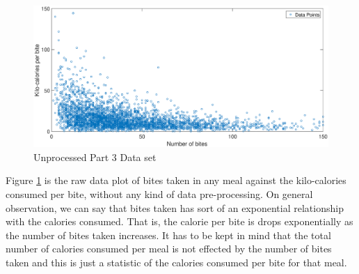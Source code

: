 \documentclass[12pt]{article}
\begin{document}
\begin{figure}[b!]
\centering
	\includegraphics[width=\textwidth]{dataC}
	\caption{Unprocessed Part 3 Data set }
	\label{fig:unproc}
\end{figure}
\noindent
Figure \ref{fig:unproc} is the raw data plot of bites taken in any meal against the kilo-calories consumed per bite, without any kind of data pre-processing. On general observation, we can say that bites taken has sort of an exponential relationship with the calories consumed. That is, the calorie per bite is drops exponentially as the number of bites taken increases. It has to be kept in mind that the total number of calories consumed per meal is not effected by the number of bites taken and this is just a statistic of the calories consumed per bite for that meal. \\
\end{document}
